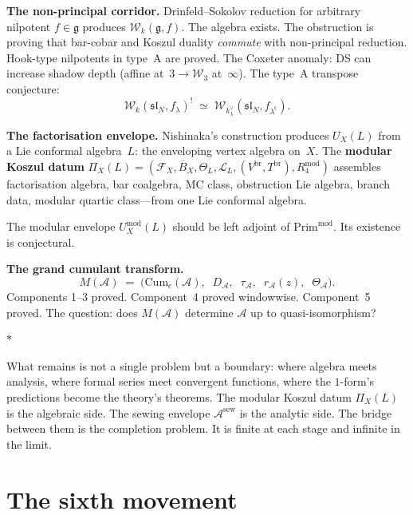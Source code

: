 \documentclass[11pt]{article}
\newcommand{\cA}{\mathcal{A}}
\newcommand{\cW}{\mathcal{W}}
\newcommand{\fg}{\mathfrak{g}}
\newcommand{\fsl}{\mathfrak{sl}}
\newcommand{\barB}{\overline{B}}
\newcommand{\sep}{\bigskip\begin{center}$*$\end{center}\medskip}
\begin{document}
\medskip

\noindent\textbf{The non-principal corridor.}\enspace
Drinfeld--Sokolov reduction for arbitrary nilpotent
$f \in \fg$ produces $\cW_k(\fg, f)$.  The algebra exists.
The obstruction is proving that bar-cobar and Koszul duality
\emph{commute} with non-principal reduction.  Hook-type
nilpotents in type~A are proved.  The Coxeter anomaly: DS can
increase shadow depth (affine at~$3 \to \cW_3$ at~$\infty$).
The type~A transpose conjecture:
\[
\cW_k(\fsl_N, f_\lambda)^!
\;\simeq\;
\cW_{k^\vee_\lambda}(\fsl_N, f_{\lambda^{\mathrm{t}}}).
\]

\medskip

\noindent\textbf{The factorisation envelope.}\enspace
Nishinaka's construction produces $U_X(L)$ from a Lie
conformal algebra~$L$: the enveloping vertex algebra on~$X$.
The \textbf{modular Koszul datum}
$\Pi_X(L) = (\mathcal{F}_X, \barB_X, \Theta_L,
\mathcal{L}_L, (V^{\mathrm{br}}, T^{\mathrm{br}}),
R_4^{\mathrm{mod}})$ assembles factorisation algebra, bar
coalgebra, MC class, obstruction Lie algebra, branch data,
modular quartic class---from one Lie conformal algebra.

The modular envelope $U^{\mathrm{mod}}_X(L)$ should be
left adjoint of $\mathrm{Prim}^{\mathrm{mod}}$.  Its
existence is conjectural.

\medskip

\noindent\textbf{The grand cumulant transform.}\enspace
\begin{equation}\label{eq:grand-cumulant-wn}
M(\cA) \;=\;
\bigl(\mathrm{Cum}_c(\cA),\;\; D_\cA,\;\;
\tau_\cA,\;\; r_\cA(z),\;\; \Theta_\cA\bigr).
\end{equation}
Components 1--3 proved.  Component~4 proved windowwise.
Component~5 proved.  The question: does $M(\cA)$ determine
$\cA$ up to quasi-isomorphism?

\sep

What remains is not a single problem but a boundary: where
algebra meets analysis, where formal series meet convergent
functions, where the $1$-form's predictions become the
theory's theorems.  The modular Koszul datum $\Pi_X(L)$ is the
algebraic side.  The sewing envelope $\cA^{\mathrm{sew}}$
is the analytic side.  The bridge between them is the
completion problem.  It is finite at each stage and infinite
in the limit.


\section{The sixth movement}
\label{sec:sixth-movement}
\end{document}
